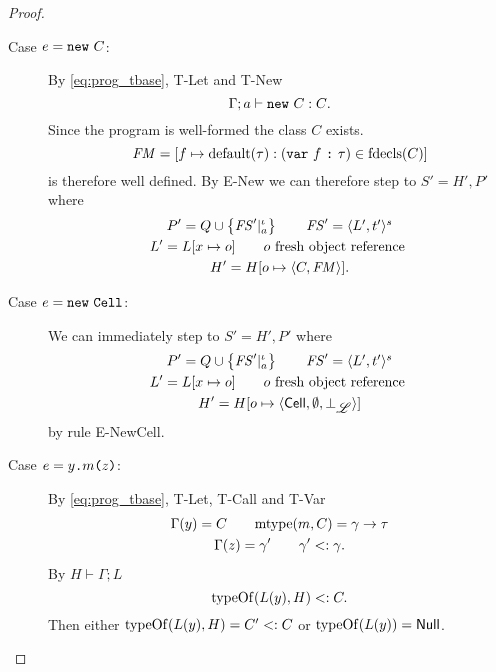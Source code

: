 \begin{proof}
\begin{description}
\begin{description}
        \item[Case $e = \mbox{\mdseries\texttt{new}~$C$}$:]
          By \eqref{eq:prog_tbase}, {\sc T-Let} and {\sc T-New}
          \begin{equation*}
            \mbox{$\Gamma;a\vdash\mbox{\mdseries\texttt{new}~$C$}:C$}.
          \end{equation*}
          Since the program is well-formed the class $C$ exists. 
          \begin{equation*}
            \mathit{FM} = [f \mapsto \mbox{$\mathrm{default}$}(\tau): (\mbox{\mdseries\texttt{var}~$f$~\texttt{:}~$\tau$}) \in \mbox{$\mathrm{fdecls}$}(C)]
          \end{equation*}
          is therefore well defined. By {\sc E-New} we can therefore step to $S'
          = H', P'$ where
          \begin{equation*}
            \begin{gathered}
              P' = Q \cup \left\{\mathit{FS}'|_a^\iota \right\} \quad\quad \mathit{FS}' = \mbox{$\langle L',
              t' \rangle^s$} \\
              L' = L[x \mapsto o] \quad\quad o \text{ fresh object reference } \\
              H' = H[o \mapsto \mbox{$\langle C, \mathit{FM} \rangle$}].
            \end{gathered}
          \end{equation*}
          \contradiction

        \item[Case $e = \mbox{\mdseries\texttt{new}~\texttt{Cell}}$:]
          We can immediately step to $S' = H', P'$ where
          \begin{equation*}
            \begin{gathered}
              P' = Q \cup \left\{\mathit{FS}'|_a^\iota \right\} \quad\quad \mathit{FS}' = \mbox{$\langle L',
              t' \rangle^s$} \\
              L' = L[x \mapsto o] \quad\quad o \text{ fresh object reference } \\
              H' = H[o \mapsto \mbox{$\langle \mbox{$\mathsf{Cell}$}{}, \emptyset, \bot_{\mbox{$\mathscr{L}$}} \rangle$}]
            \end{gathered}
          \end{equation*}
          by rule {\sc E-NewCell}. \contradiction
      
        \item[Case $e = \mbox{\mdseries$y$\texttt{.}$m$\texttt{(}$z$\texttt{)}}$:]
          By \eqref{eq:prog_tbase}, {\sc T-Let}, {\sc T-Call} and {\sc T-Var}
          \begin{equation*}
            \begin{gathered}
              \Gamma(y) = C \quad\quad \mbox{$\mathrm{mtype}$}(m, C) = \gamma \to \tau \\
              \Gamma(z) = \gamma' \quad\quad \gamma' <: \gamma.
            \end{gathered}
          \end{equation*}
          By $H \vdash \Gamma;L$ 
          \begin{equation*}
            \mbox{$\mathrm{typeOf}$}(L(y), H) <: C.
          \end{equation*}
          Then either $\mbox{$\mathrm{typeOf}$}(L(y), H) = C' <: C$ or $\mbox{$\mathrm{typeOf}$}(L(y)) =
          \mbox{$\mathsf{Null}$}$.


\end{description}
\end{description}
\end{proof}
